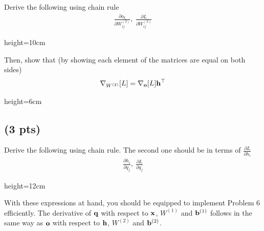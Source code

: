 Derive the following using chain rule
\begin{align}
    \frac{\partial o_k}{\partial W^{(2)}_{ij}},\ 
    \frac{\partial L}{\partial W^{(2)}_{ij}}
\end{align}

\begin{soln}{height=10cm}
\ThreeCA
\end{soln}

Then, show that (by showing each element of the matrices are equal on both sides) 
\begin{align}
    \nabla_{W^{(2)}} [L] = \nabla_{\bf{o}}[L]{\bf{h}}^{\top}
\end{align}

\begin{soln}{height=6cm}
\ThreeCB
\end{soln}

\clearpage

\subsection{(3 pts)}

Derive the following using chain rule. The second one should be in terms of $\frac{\partial L}{\partial h_i}$
\begin{align}
    \frac{\partial h_i}{\partial q_j},\ 
    \frac{\partial L}{\partial q_j}
\end{align}

\begin{soln}{height=12cm}
\ThreeD
\end{soln}

With these expressions at hand, you should be equipped to implement Problem $6$ efficiently. The derivative of ${\bf{q}}$ with respect to ${\bf{x}}$, $W^{(1)}$ and ${\bf{b}}^{(1)}$ follows in the same way as ${\bf{o}}$ with respect to ${\bf{h}}$, $W^{(2)}$ and ${\bf{b}}^{(2)}$.